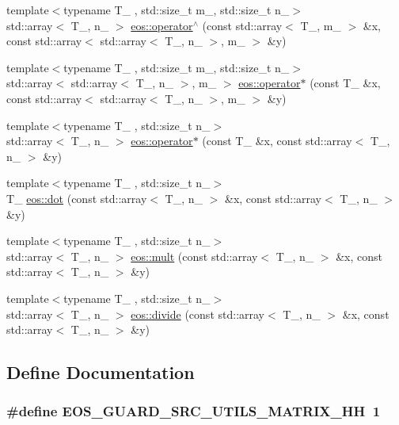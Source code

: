 \begin{DoxyCompactItemize}
\item 
{\footnotesize template$<$typename T\_\- , std::size\_\-t m\_\-, std::size\_\-t n\_\-$>$ }\\std::array$<$ T\_\-, n\_\- $>$ \hyperlink{namespaceeos_a6d8071776e060cb58300bc883d5510b7}{eos::operator$^\wedge$} (const std::array$<$ T\_\-, m\_\- $>$ \&x, const std::array$<$ std::array$<$ T\_\-, n\_\- $>$, m\_\- $>$ \&y)
\item 
{\footnotesize template$<$typename T\_\- , std::size\_\-t m\_\-, std::size\_\-t n\_\-$>$ }\\std::array$<$ std::array$<$ T\_\-, n\_\- $>$, m\_\- $>$ \hyperlink{namespaceeos_ab6da54e708e1d703fd399d7e7a0912f8}{eos::operator$\ast$} (const T\_\- \&x, const std::array$<$ std::array$<$ T\_\-, n\_\- $>$, m\_\- $>$ \&y)
\item 
{\footnotesize template$<$typename T\_\- , std::size\_\-t n\_\-$>$ }\\std::array$<$ T\_\-, n\_\- $>$ \hyperlink{namespaceeos_a6192a8a135c1f4ea6163e1d7f59275a0}{eos::operator$\ast$} (const T\_\- \&x, const std::array$<$ T\_\-, n\_\- $>$ \&y)
\item 
{\footnotesize template$<$typename T\_\- , std::size\_\-t n\_\-$>$ }\\T\_\- \hyperlink{namespaceeos_ac3181f83f30b4811151158ffc68a5396}{eos::dot} (const std::array$<$ T\_\-, n\_\- $>$ \&x, const std::array$<$ T\_\-, n\_\- $>$ \&y)
\item 
{\footnotesize template$<$typename T\_\- , std::size\_\-t n\_\-$>$ }\\std::array$<$ T\_\-, n\_\- $>$ \hyperlink{namespaceeos_ae34de7634e8e232a4a7761b998e1535f}{eos::mult} (const std::array$<$ T\_\-, n\_\- $>$ \&x, const std::array$<$ T\_\-, n\_\- $>$ \&y)
\item 
{\footnotesize template$<$typename T\_\- , std::size\_\-t n\_\-$>$ }\\std::array$<$ T\_\-, n\_\- $>$ \hyperlink{namespaceeos_a8031207b4e14e35ca72988b76bfaacf1}{eos::divide} (const std::array$<$ T\_\-, n\_\- $>$ \&x, const std::array$<$ T\_\-, n\_\- $>$ \&y)
\end{DoxyCompactItemize}


\subsection{Define Documentation}
\hypertarget{matrix_8hh_ad2e12ccc63e8b682bb3a09a7a9d97499}{
\subsubsection[{EOS\_\-GUARD\_\-SRC\_\-UTILS\_\-MATRIX\_\-HH}]{\setlength{\rightskip}{0pt plus 5cm}\#define EOS\_\-GUARD\_\-SRC\_\-UTILS\_\-MATRIX\_\-HH~1}}
\label{matrix_8hh_ad2e12ccc63e8b682bb3a09a7a9d97499}
